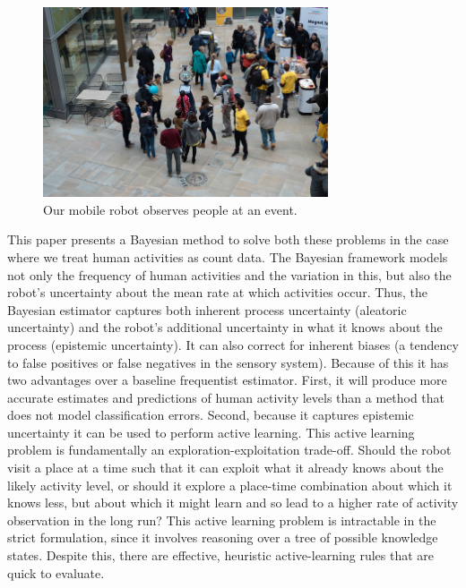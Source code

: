 \begin{figure}[t!]
	\centering
	\includegraphics[width=0.75\textwidth]{./figures/robot_in_human_environment.jpeg}
	\caption{Our mobile robot observes people at an event.} 
	\label{fig:robot_in_human_environment}
	\vspace{-10pt}
\end{figure}

This paper presents a Bayesian method to solve both these problems in the case where we treat human activities as count data. %
The Bayesian framework models not only the frequency of human activities and the variation in this, but also the robot's uncertainty about the mean rate at which activities occur. Thus, the Bayesian estimator captures both inherent process uncertainty (aleatoric uncertainty) and the robot's additional uncertainty in what it knows about the process (epistemic uncertainty). It can also correct for inherent biases (a tendency to false positives or false negatives in the sensory system). Because of this it has two advantages over a baseline frequentist estimator. First, it will produce more accurate estimates and predictions of human activity levels than a method that does not model classification errors. Second, because it captures epistemic uncertainty it can be used to perform active learning. This active learning problem is fundamentally an exploration-exploitation trade-off. Should the robot visit a place at a time such that it can exploit what it already knows about the likely activity level, or should it explore a place-time combination about which it knows less, but about which it might learn and so lead to a higher rate of activity observation in the long run? This active learning problem is intractable in the strict formulation, since it involves reasoning over a tree of possible knowledge states. Despite this, there are effective, heuristic active-learning rules that are quick to evaluate. %

